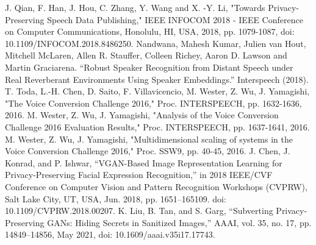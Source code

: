 \documentclass[journal]{IEEEtran} %
\begin{document}
\begin{thebibliography}{00}
     J. Qian, F. Han, J. Hou, C. Zhang, Y. Wang and X. -Y. Li, "Towards Privacy-Preserving Speech Data Publishing," IEEE INFOCOM 2018 - IEEE Conference on Computer Communications, Honolulu, HI, USA, 2018, pp. 1079-1087, doi: 10.1109/INFOCOM.2018.8486250.
     Nandwana, Mahesh Kumar, Julien van Hout, Mitchell McLaren, Allen R. Stauffer, Colleen Richey, Aaron D. Lawson and Martin Graciarena. “Robust Speaker Recognition from Distant Speech under Real Reverberant Environments Using Speaker Embeddings.” Interspeech (2018).
     T. Toda, L.-H. Chen, D. Saito, F. Villavicencio, M. Wester, Z. Wu, J. Yamagishi, "The Voice Conversion Challenge 2016," Proc. INTERSPEECH, pp. 1632-1636, 2016.
     M. Wester, Z. Wu, J. Yamagishi, "Analysis of the Voice Conversion Challenge 2016 Evaluation Results," Proc. INTERSPEECH, pp. 1637-1641, 2016.
     M. Wester, Z. Wu, J. Yamagishi, "Multidimensional scaling of systems in the Voice Conversion Challenge 2016," Proc. SSW9, pp. 40-45, 2016.
     J. Chen, J. Konrad, and P. Ishwar, “VGAN-Based Image Representation Learning for Privacy-Preserving Facial Expression Recognition,” in 2018 IEEE/CVF Conference on Computer Vision and Pattern Recognition Workshops (CVPRW), Salt Lake City, UT, USA, Jun. 2018, pp. 1651–165109. doi: 10.1109/CVPRW.2018.00207.
     K. Liu, B. Tan, and S. Garg, “Subverting Privacy-Preserving GANs: Hiding Secrets in Sanitized Images,” AAAI, vol. 35, no. 17, pp. 14849–14856, May 2021, doi: 10.1609/aaai.v35i17.17743.
\end{thebibliography}
\end{document}
